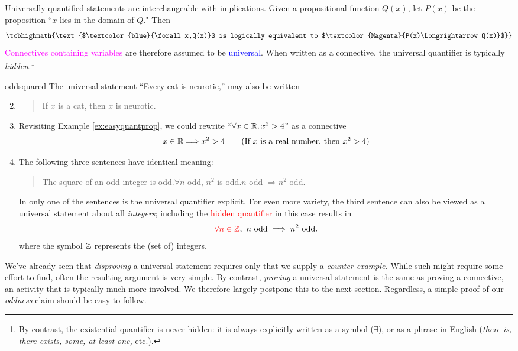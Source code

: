 
Universally quantified statements are interchangeable with implications. Given a propositional function $Q(x)$, let $P(x)$ be the proposition ``$x$ lies in the domain of $Q$." Then
\[
	\tcbhighmath{\text{$\textcolor{blue}{\forall x,Q(x)}$ is logically equivalent to $\textcolor{Magenta}{P(x)\Longrightarrow Q(x)}$}}
\]
\textcolor{Magenta}{Connectives containing variables} are therefore assumed to be \textcolor{blue}{universal}. When written as a connective, the universal quantifier is typically \emph{hidden.}\footnote{By contrast, the existential quantifier is never hidden: it is always explicitly written as a symbol ($\exists$), or as a phrase in English (\emph{there is, there exists, some, at least one,} etc.).}

\begin{examples}{}{oddsquared}
	\exstart The universal statement ``Every cat is neurotic,'' may also be written
	\begin{enumerate}\setcounter{enumi}{1}
	  \item[]\begin{quote}
			If $x$ is a cat, then $x$ is neurotic.
		\end{quote} 
		
		\item Revisiting Example \ref{ex:easyquantprop}, we could rewrite ``$\forall x\in\mathbb{R}, x^2>4$'' as a connective
		\[
			x\in\mathbb{R}\Longrightarrow x^2>4 \tag{If $x$ is a real number, then $x^2>4$}
		\]
		
	  \item\label{ex:oddsquared2} The following three sentences have identical meaning:
	  \begin{quote}
	  	The square of an odd integer is odd.\qquad $\forall n$ odd, $n^2$ is odd.\qquad $n$ odd $\Longrightarrow n^2$ odd.
	  \end{quote}
	  In only one of the sentences is the universal quantifier explicit. For even more variety, the third sentence can also be viewed as a universal statement about all \emph{integers}; including the \textcolor{red}{hidden quantifier} in this case results in
		\[
			\textcolor{red}{\forall n\in\mathbb{Z}},\ n\text{ odd} \implies n^2 \text{ odd.}
		\]
		where the symbol $\mathbb{Z}$ represents the (set of) integers.
	\end{enumerate}
\end{examples}

We've already seen that \emph{disproving} a universal statement requires only that we supply a \emph{counter-example.} While such might require some effort to find, often the resulting argument is very simple. By contrast, \emph{proving} a universal statement is the same as proving a connective, an activity that is typically much more involved. We therefore largely postpone this to the next section. Regardless, a simple proof of our \emph{oddness} claim should be easy to follow.

